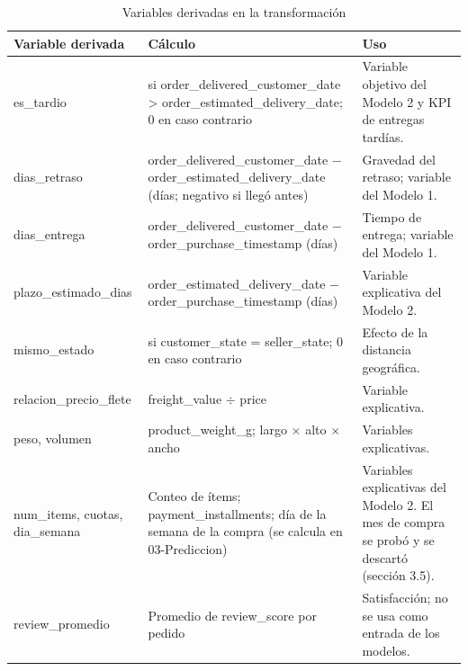 \documentclass[a4paper,stu,12pt,donotrepeattitle,floatsintext]{apa7}
\begin{document}
{\footnotesize
\begin{longtable}{|>{\raggedright\arraybackslash}p{}|>{\raggedright\arraybackslash}p{}|>{\raggedright\arraybackslash}p{}|}
\caption{Variables derivadas en la transformación}\\
\hline
\textbf{Variable derivada} & \textbf{Cálculo} & \textbf{Uso} \\ \hline
\endhead
es\_\allowbreak{}tardio & 1 si order\_\allowbreak{}delivered\_\allowbreak{}customer\_\allowbreak{}date > order\_\allowbreak{}estimated\_\allowbreak{}delivery\_\allowbreak{}date; 0 en caso contrario & Variable objetivo del Modelo 2 y KPI de entregas tardías. \\ \hline
dias\_\allowbreak{}retraso & order\_\allowbreak{}delivered\_\allowbreak{}customer\_\allowbreak{}date $-$ order\_\allowbreak{}estimated\_\allowbreak{}delivery\_\allowbreak{}date (días; negativo si llegó antes) & Gravedad del retraso; variable del Modelo 1. \\ \hline
dias\_\allowbreak{}entrega & order\_\allowbreak{}delivered\_\allowbreak{}customer\_\allowbreak{}date $-$ order\_\allowbreak{}purchase\_\allowbreak{}timestamp (días) & Tiempo de entrega; variable del Modelo 1. \\ \hline
plazo\_\allowbreak{}estimado\_\allowbreak{}dias & order\_\allowbreak{}estimated\_\allowbreak{}delivery\_\allowbreak{}date $-$ order\_\allowbreak{}purchase\_\allowbreak{}timestamp (días) & Variable explicativa del Modelo 2. \\ \hline
mismo\_\allowbreak{}estado & 1 si customer\_\allowbreak{}state = seller\_\allowbreak{}state; 0 en caso contrario & Efecto de la distancia geográfica. \\ \hline
relacion\_\allowbreak{}precio\_\allowbreak{}flete & freight\_\allowbreak{}value $\div$ price & Variable explicativa. \\ \hline
peso, volumen & product\_\allowbreak{}weight\_\allowbreak{}g; largo $\times$ alto $\times$ ancho & Variables explicativas. \\ \hline
num\_\allowbreak{}items, cuotas, dia\_\allowbreak{}semana & Conteo de ítems; payment\_\allowbreak{}installments; día de la semana de la compra (se calcula en 03-Prediccion) & Variables explicativas del Modelo 2. El mes de compra se probó y se descartó (sección 3.5). \\ \hline
review\_\allowbreak{}promedio & Promedio de review\_\allowbreak{}score por pedido & Satisfacción; no se usa como entrada de los modelos. \\ \hline

\end{longtable}}
\end{document}
